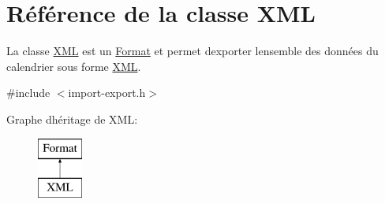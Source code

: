 \hypertarget{class_x_m_l}{}\section{Référence de la classe X\+M\+L}
\label{class_x_m_l}


La classe \hyperlink{class_x_m_l}{X\+M\+L} est un \hyperlink{class_format}{Format} et permet d\textquotesingle{}exporter l\textquotesingle{}ensemble des données du calendrier sous forme \hyperlink{class_x_m_l}{X\+M\+L}.  




{\ttfamily \#include $<$import-\/export.\+h$>$}

Graphe d\textquotesingle{}héritage de X\+M\+L\+:\begin{figure}[H]
\begin{center}
\leavevmode
\includegraphics[height=2.000000cm]{class_x_m_l}
\end{center}
\end{figure}
